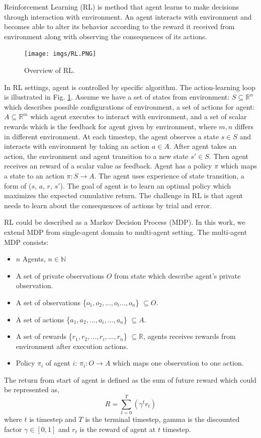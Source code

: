 \documentclass[11pt,twocolumn]{jarticle} %
\begin{document}
Reinforcement Learning (RL) is method that agent learns to make decisions through interaction with environment. An agent interacts with environment and becomes able to alter its behavior according to the reward it received from environment along with observing the consequences of its actions. \par

\begin{figure}[h]
 \begin{center}
  \texttt{[image: imgs/RL.PNG]}
  \caption{
  Overview of RL.
  }
  \label{fig:rl}
 \end{center}
\end{figure}

In RL settings, agent is controlled by specific algorithm. The action-learning loop is illustrated in Fig. \ref{fig:rl}. Assume we have a set of states from environment: $S \subseteq \mathbb{R}^n$ which describes possible configurations of environment, a set of actions for agent: $A \subseteq \mathbb{R}^m$ which agent executes to interact with environment, and a set of scalar rewards which is the feedback for agent given by environment, where $m, n$ differs in different environment. At each timestep, the agent observes a state $s \in S$ and interacts with environment by taking an action $a \in A$. After agent takes an action, the environment and agent transition to a new state $s' \in S$. Then agent receives an reward of a scalar value as feedback. Agent has a policy $\pi$ which maps a state to an action $\pi: S \rightarrow A$. The agent uses experience of state transition, a form of ($s$, $a$, $r$, $s'$). The goal of agent is to learn an optimal policy which maximizes the expected cumulative return. The challenge in RL is that agent needs to learn about the consequences of actions by trial and error. \par

RL could be described as a Markov Decision Process (MDP). In this work, we extend MDP from single-agent domain to multi-agent setting. The multi-agent MDP consists:
\begin{itemize}
  \item $n$ Agents, $n \in \mathbb{N}$
  \item A set of private observations $O$ from state which describe agent's private observation. 
  \item A set of observations \{${o_1, o_2,\ldots, o_i\ldots, o_n}$\} $\subseteq O$.
  \item A set of actions \{${a_1, a_2,\ldots, a_i,\ldots, a_n}$\} $\subseteq A$.
  \item A set of rewards \{${r_1, r_2,\ldots, r_i,\ldots, r_n}$\} $\subseteq \mathbb{R}$, agents receives rewards from environment after execution actions.
  \item Policy $\pi_i$ of agent $i$: $\pi_i: O \rightarrow A$ which maps one observation to one action.
\end{itemize}
The return from start of agent is defined as the sum of future reward which could be represented as, 
$$ R = \sum_{t=0}^{T}(\gamma^t r_t) $$
where $t$ is timestep and $T$ is the terminal timestep, gamma is the discounted factor $\gamma \in [0, 1]$ and $r_t$ is the reward of agent at $t$ timestep.
\end{document}
